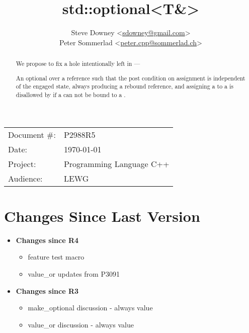 \documentclass[a4paper,10pt,oneside,openany,final,article]{memoir}
\begin{document}
\title{std::optional<T\&>}
\author{
  Steve Downey \small<\href{mailto:sdowney@gmail.com}{sdowney@gmail.com}> \\
  Peter Sommerlad \small<\href{mailto:peter.cpp@sommerlad.ch}{peter.cpp@sommerlad.ch}> \\
}
\date{} %
\maketitle

\begin{flushright}
  \begin{tabular}{ll}
    Document \#: & P2988R5 \\
    Date: & \today \\
    Project: & Programming Language C++ \\
    Audience: & LEWG
  \end{tabular}
\end{flushright}

\begin{abstract}
  We propose to fix a hole intentionally left in  ---

  An optional over a reference such that the post condition on assignment is independent of the engaged state, always producing a rebound reference, and assigning a  to a  is disallowed by  if a  can not be bound to a .
\end{abstract}

\tableofcontents*

\chapter*{Changes Since Last Version}

\begin{itemize}
\item \textbf{Changes since R4}
  \begin{itemize}
  \item feature test macro
  \item value_or updates from P3091
  \end{itemize}
\item \textbf{Changes since R3}
  \begin{itemize}
  \item make_optional discussion - always value
  \item value_or discussion - always value
  \end{itemize}
\end{itemize}
\end{document}
